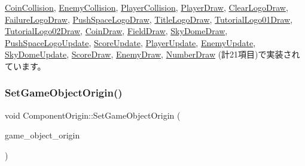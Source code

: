 \mbox{\hyperlink{class_coin_collision_a4119a7decab2410a4ada3568ad0c132d}{Coin\+Collision}}, \mbox{\hyperlink{class_enemy_collision_ae5c000a30c8c4a023dd0c8e658def772}{Enemy\+Collision}}, \mbox{\hyperlink{class_player_collision_a3dd6238b75933fd60aee77e92353cc44}{Player\+Collision}}, \mbox{\hyperlink{class_player_draw_ad79a0fbeb618e0913822b573e5d0be68}{Player\+Draw}}, \mbox{\hyperlink{class_clear_logo_draw_a9af656c0a8ebfb5fa133a0983add6ffd}{Clear\+Logo\+Draw}}, \mbox{\hyperlink{class_failure_logo_draw_a718d587edcabb1feea72153a79a65176}{Failure\+Logo\+Draw}}, \mbox{\hyperlink{class_push_space_logo_draw_a7ad3fe53d9bda4ea16c958bc102ff54e}{Push\+Space\+Logo\+Draw}}, \mbox{\hyperlink{class_title_logo_draw_a9f70fb70639510908f4e07ee14667e30}{Title\+Logo\+Draw}}, \mbox{\hyperlink{class_tutorial_logo01_draw_a4ef239c2fcd12ddd8a0a9256bedacdcb}{Tutorial\+Logo01\+Draw}}, \mbox{\hyperlink{class_tutorial_logo02_draw_abc431ab08655c42960659da325d34f13}{Tutorial\+Logo02\+Draw}}, \mbox{\hyperlink{class_coin_draw_ad0f5da5cfb896541fd59b1ab4a8593d1}{Coin\+Draw}}, \mbox{\hyperlink{class_field_draw_a4287d2ce33033b2413c1d3a81b173373}{Field\+Draw}}, \mbox{\hyperlink{class_sky_dome_draw_a5b82e8b650a20dbc0b7ed720d1fb7fab}{Sky\+Dome\+Draw}}, \mbox{\hyperlink{class_push_space_logo_update_a9c165604160c012b429c1db1d67ffb2a}{Push\+Space\+Logo\+Update}}, \mbox{\hyperlink{class_score_update_afd51e11ad00ebc15d9b3139398437afc}{Score\+Update}}, \mbox{\hyperlink{class_player_update_ac72b39db7b7bfaf094bde9ed1adef4b7}{Player\+Update}}, \mbox{\hyperlink{class_enemy_update_a5b68696e964f71fca73c9143e3770c9d}{Enemy\+Update}}, \mbox{\hyperlink{class_sky_dome_update_ab4fec6d13590c07e39e6e8b4f7f7613a}{Sky\+Dome\+Update}}, \mbox{\hyperlink{class_score_draw_af013abb96136825e71d4fee06529fc69}{Score\+Draw}}, \mbox{\hyperlink{class_enemy_draw_aa1659c35fa757db6a6cf07e26ad9ddfb}{Enemy\+Draw}}, \mbox{\hyperlink{class_number_draw_ad52c1e8b9ae6e830a82c440cc18cb6c9}{Number\+Draw}} (計21項目)で実装されています。

\mbox{\label{class_component_origin_aba1eb38e463b1cf2c31589db69b2adef}} 
\subsubsection{\texorpdfstring{Set\+Game\+Object\+Origin()}{SetGameObjectOrigin()}}
{\footnotesize\ttfamily void Component\+Origin\+::\+Set\+Game\+Object\+Origin (\begin{DoxyParamCaption}\item[{\mbox{\hyperlink{class_game_object_origin}{Game\+Object\+Origin}} $\ast$}]{game\+\_\+object\+\_\+origin }\end{DoxyParamCaption})\hspace{0.3cm}{\ttfamily [inline]}}

